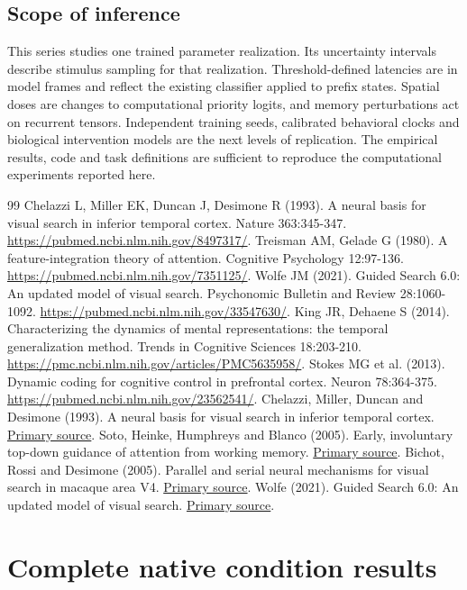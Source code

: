 \documentclass[11pt]{article}
\begin{document}
\subsection{Scope of inference}
This series studies one trained parameter realization. Its uncertainty intervals describe stimulus sampling for that realization. Threshold-defined latencies are in model frames and reflect the existing classifier applied to prefix states. Spatial doses are changes to computational priority logits, and memory perturbations act on recurrent tensors. Independent training seeds, calibrated behavioral clocks and biological intervention models are the next levels of replication. The empirical results, code and task definitions are sufficient to reproduce the computational experiments reported here.

\begin{thebibliography}{99}
 Chelazzi L, Miller EK, Duncan J, Desimone R (1993). A neural basis for visual search in inferior temporal cortex. Nature 363:345-347. \url{https://pubmed.ncbi.nlm.nih.gov/8497317/}.
 Treisman AM, Gelade G (1980). A feature-integration theory of attention. Cognitive Psychology 12:97-136. \url{https://pubmed.ncbi.nlm.nih.gov/7351125/}.
 Wolfe JM (2021). Guided Search 6.0: An updated model of visual search. Psychonomic Bulletin and Review 28:1060-1092. \url{https://pubmed.ncbi.nlm.nih.gov/33547630/}.
 King JR, Dehaene S (2014). Characterizing the dynamics of mental representations: the temporal generalization method. Trends in Cognitive Sciences 18:203-210. \url{https://pmc.ncbi.nlm.nih.gov/articles/PMC5635958/}.
 Stokes MG et al. (2013). Dynamic coding for cognitive control in prefrontal cortex. Neuron 78:364-375. \url{https://pubmed.ncbi.nlm.nih.gov/23562541/}.
 Chelazzi, Miller, Duncan and Desimone (1993). A neural basis for visual search in inferior temporal cortex. \href{https://pubmed.ncbi.nlm.nih.gov/8497317/}{Primary source}.
 Soto, Heinke, Humphreys and Blanco (2005). Early, involuntary top-down guidance of attention from working memory. \href{https://www.comp-psych.bham.ac.uk/publications/soto_jep2005.pdf}{Primary source}.
 Bichot, Rossi and Desimone (2005). Parallel and serial neural mechanisms for visual search in macaque area V4. \href{https://doi.org/10.1126/science.1109676}{Primary source}.
 Wolfe (2021). Guided Search 6.0: An updated model of visual search. \href{https://doi.org/10.3758/s13423-020-01859-9}{Primary source}.
\end{thebibliography}\clearpage\appendix\section{Complete native condition results}
\end{document}
